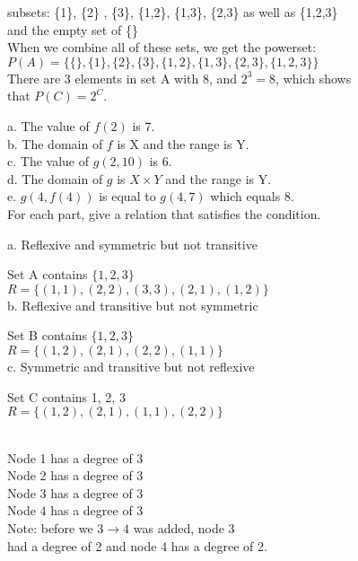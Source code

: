 \documentclass[12pt]{article}
\begin{document}
subsets: \{1\}, \{2\} , \{3\}, \{1,2\}, \{1,3\}, \{2,3\} as well as \{1,2,3\} \\
\indent and the empty set of \{\} \\

When we combine all of these sets, we get the powerset: \\
\indent $P(A) = \{\{\},  \{1\}, \{2\}, \{3\}, \{1,2\}, \{1,3\}, \{2,3\}, \{1,2,3\}  \}$ \\

There are 3 elements in set A with 8, and $2^{3} = 8$, which shows \\
\indent that $P(C) = 2^{C}$. \\


a. The value of $f(2)$ is 7. \\
\indent b. The domain of $f$ is X and the range is Y. \\
\indent c. The value of $g(2,10)$ is 6. \\
\indent d. The domain of $g$ is $X \times Y$ and the range is Y. \\
\indent e. $g(4, f(4))$ is equal to $g(4, 7)$ which equals 8. \\

 \quad For each part, give a relation that satisfies the condition.

a. Reflexive and symmetric but not transitive

\quad Set A contains $\{1, 2, 3\}$ \\
\indent \quad $R = \{(1,1), (2,2), (3,3), (2,1), (1, 2) \}$ \\

b. Reflexive and transitive but not symmetric

\quad Set B contains $\{1, 2, 3\}$ \\
\indent \quad $R = \{(1,2), (2,1), (2,2), (1,1)\} $ \\

c. Symmetric and transitive but not reflexive

\quad Set C contains {1, 2, 3} \\
\indent \quad $R = \{(1,2), (2,1), (1,1), (2,2)\}$ \\ \\


		Node 1 has a degree of 3 \\
\indent Node 2 has a degree of 3 \\
\indent Node 3 has a degree of 3 \\
\indent Node 4 has a degree of 3 \\
\indent Note: before we $3 \rightarrow 4$ was added, node 3 \\
\indent had a degree of 2 and node 4 has a degree of 2. \\
\end{document}
